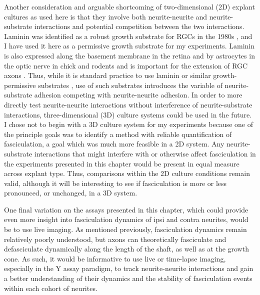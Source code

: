Another consideration and arguable shortcoming of two-dimensional (2D) explant cultures as used here is that they involve both neurite-neurite and neurite-substrate interactions and potential competition between the two interactions.
Laminin was identified as a robust growth substrate for RGCs \invitro{} in the 1980s \cite{smalheiser1984laminin,cohen1985retinal}, and I have used it here as a permissive growth substrate for my experiments.
Laminin is also expressed along the basement membrane in the retina and by astrocytes in the optic nerve in chick and rodents and is important for the extension of RGC axons \invivo{} \cite{cohen1987role,liesi1988astrocyte,sarthy1990localization,morissette1995laminin}.
Thus, while it is standard practice to use laminin or similar growth-permissive substrates \invitro{}, use of such substrates introduces the variable of neurite-substrate adhesion competing with neurite-neurite adhesion.
In order to more directly test neurite-neurite interactions without interference of neurite-substrate interactions, three-dimensional (3D) culture systems could be used in the future.
I chose not to begin with a 3D culture system for my experiments because one of the principle goals was to identify a method with reliable quantification of fasciculation, a goal which was much more feasible in a 2D system.
Any neurite-substrate interactions that might interfere with or otherwise affect fasciculation in the experiments presented in this chapter would be present in equal measure across explant type.
Thus, comparisons within the 2D culture conditions remain valid, although it will be interesting to see if fasciculation is more or less pronounced, or unchanged, in a 3D system.

One final variation on the assays presented in this chapter, which could provide even more insight into fasciculation dynamics of ipsi and contra neurites, would be to use live imaging. 
As mentioned previously, fasciculation dynamics remain relatively poorly understood, but axons can theoretically fasciculate and defasciculate dynamically along the length of the shaft, as well as at the growth cone.
As such, it would be informative to use live or time-lapse imaging, especially in the Y assay paradigm, to track neurite-neurite interactions and gain a better understanding of their dynamics and the stability of fasciculation events within each cohort of neurites.